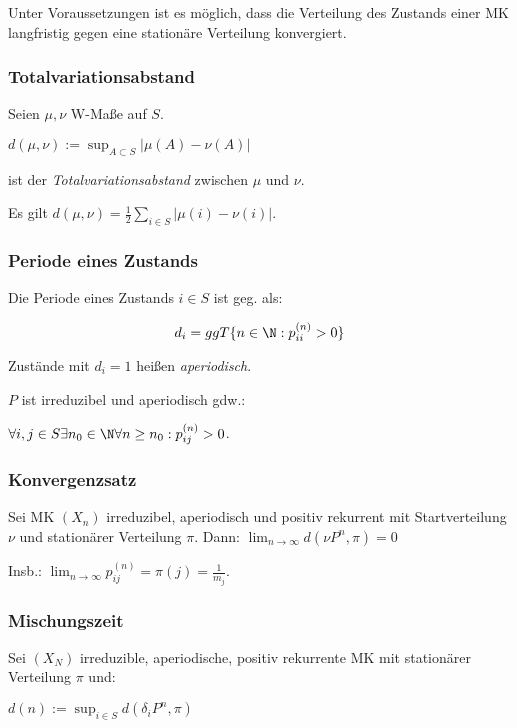 Unter Voraussetzungen ist es möglich, dass die Verteilung des Zustands einer MK langfristig gegen eine stationäre Verteilung konvergiert.

\subsubsection*{Totalvariationsabstand}

Seien $\mu, \nu$ W-Maße auf $S$.

$d(\mu, \nu) := \sup_{A \subset S} |\mu(A)-\nu(A)|$

ist der \emph{Totalvariationsabstand} zwischen $\mu$ und $\nu$.

\vspace*{1mm}

Es gilt $d(\mu,\nu) = \frac{1}{2} \sum_{i \in S} |\mu(i) - \nu(i)|$.

\subsubsection*{Periode eines Zustands}

Die Periode eines Zustands $i \in S$ ist geg. als:

\vspace*{-2mm}
\[ d_i = ggT\{ n \in \N : p_{ii}^{(n)} > 0 \} \]

Zustände mit $d_i = 1$ heißen \emph{aperiodisch}.

$P$ ist irreduzibel und aperiodisch gdw.:

$\forall i, j \in S \exists n_0 \in \N \forall n \geq n_0 : p_{ij}^{(n)} > 0$.

\subsubsection*{Konvergenzsatz}

Sei MK $(X_n)$ irreduzibel, aperiodisch und positiv rekurrent mit Startverteilung $\nu$ und stationärer Verteilung $\pi$. Dann: $\lim_{n \to \infty} d(\nu P^n, \pi) = 0$

Insb.: $\lim_{n\to\infty} p_{ij}^{(n)} = \pi(j) = \frac{1}{m_j}$.

\subsubsection*{Mischungszeit}

Sei $(X_N)$ irreduzible, aperiodische, positiv rekurrente MK mit stationärer Verteilung $\pi$ und:

$d(n) := \sup_{i \in S} d(\delta_i P^n,\pi)$

